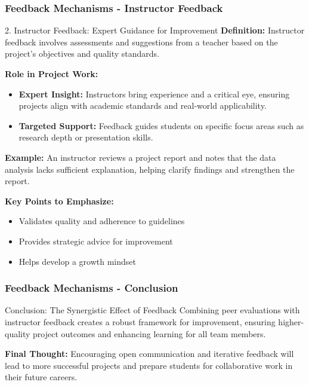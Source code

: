 \documentclass[aspectratio=169]{beamer}
\begin{document}
\begin{frame}[fragile]
    \frametitle{Feedback Mechanisms - Instructor Feedback}
    \begin{block}{2. Instructor Feedback: Expert Guidance for Improvement}
        \textbf{Definition:} Instructor feedback involves assessments and suggestions from a teacher based on the project's objectives and quality standards.

        \textbf{Role in Project Work:} 
        \begin{itemize}
            \item \textbf{Expert Insight:} Instructors bring experience and a critical eye, ensuring projects align with academic standards and real-world applicability.
            \item \textbf{Targeted Support:} Feedback guides students on specific focus areas such as research depth or presentation skills.
        \end{itemize}

        \textbf{Example:} An instructor reviews a project report and notes that the data analysis lacks sufficient explanation, helping clarify findings and strengthen the report.
    \end{block}

    \textbf{Key Points to Emphasize:}
    \begin{itemize}
        \item Validates quality and adherence to guidelines
        \item Provides strategic advice for improvement
        \item Helps develop a growth mindset
    \end{itemize}
\end{frame}

\begin{frame}[fragile]
    \frametitle{Feedback Mechanisms - Conclusion}
    \begin{block}{Conclusion: The Synergistic Effect of Feedback}
        Combining peer evaluations with instructor feedback creates a robust framework for improvement, ensuring higher-quality project outcomes and enhancing learning for all team members.
    \end{block}

    \textbf{Final Thought:} Encouraging open communication and iterative feedback will lead to more successful projects and prepare students for collaborative work in their future careers.
\end{frame}
\end{document}
